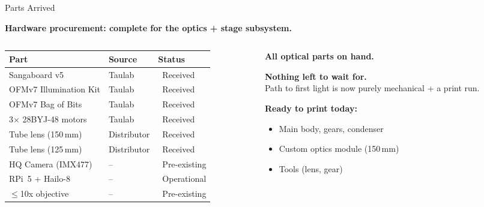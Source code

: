 \documentclass[aspectratio=169,11pt]{beamer}
\newcommand{\done}{{\color{donegreen}\ding{51}}}
\begin{document}
\begin{frame}{Parts Arrived}

  \textbf{Hardware procurement: complete for the optics + stage subsystem.}

  \vspace{0.3em}

  \begin{columns}[T]
    \begin{column}{0.55\textwidth}
      \small
      \begin{tabular}{@{}lll@{}}
        \toprule
        \textbf{Part} & \textbf{Source} & \textbf{Status} \\
        \midrule
        Sangaboard v5             & Taulab        & \done\ Received \\
        OFMv7 Illumination Kit    & Taulab        & \done\ Received \\
        OFMv7 Bag of Bits         & Taulab        & \done\ Received \\
        3$\times$ 28BYJ-48 motors & Taulab        & \done\ Received \\
        Tube lens (150\,mm)       & Distributor   & \done\ Received \\
        Tube lens (125\,mm)       & Distributor   & \done\ Received \\
        \midrule
        HQ Camera (IMX477)        & --            & \done\ Pre-existing \\
        RPi~5 + Hailo-8           & --            & \done\ Operational \\
        $\leq$10x objective       & --            & \done\ Pre-existing \\
        \bottomrule
      \end{tabular}
    \end{column}
    \begin{column}{0.42\textwidth}
      \footnotesize
      \textbf{All optical parts on hand.}

      \vspace{0.5em}
      \textbf{Nothing left to wait for.}\\
      Path to first light is now purely mechanical + a print run.

      \vspace{0.5em}
      \textbf{Ready to print today:}
      \begin{itemize}
        \item Main body, gears, condenser
        \item Custom optics module (150\,mm)
        \item Tools (lens, gear)
      \end{itemize}
    \end{column}
  \end{columns}

\end{frame}
\end{document}
